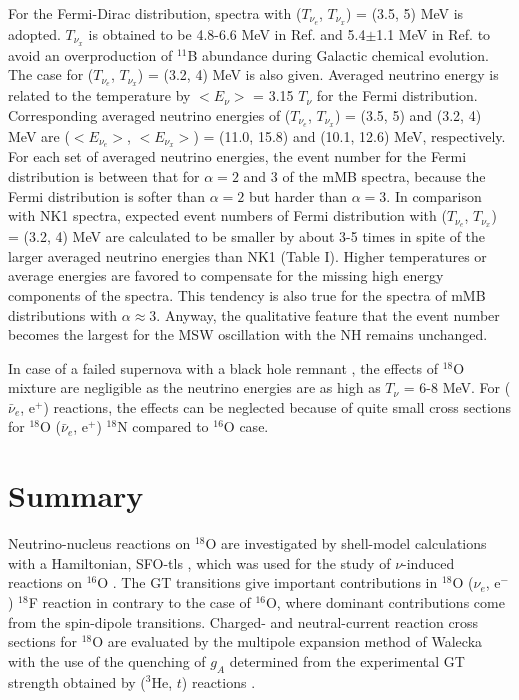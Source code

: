 \documentclass[preprint,12pt]{elsarticle}
\begin{document}
For the Fermi-Dirac distribution, spectra with ($T_{\nu_e}$, $T_{\nu_x}$) = (3.5, 5) MeV is adopted. %
$T_{\nu_x}$ is obtained to be 4.8-6.6 MeV in Ref. \cite{Yoshida2005} and 5.4$\pm$1.1 MeV in Ref. \cite{Yoshida2008} to avoid an overproduction of $^{11}$B abundance during Galactic chemical evolution.  
The case for ($T_{\nu_e}$, $T_{\nu_x}$) = (3.2, 4) MeV 
is also given.
Averaged neutrino energy is related to the temperature by $<E_{\nu}>$ = 3.15 $T_{\nu}$ for the Fermi distribution.
Corresponding averaged neutrino energies of ($T_{\nu_e}$, $T_{\nu_x}$) = (3.5, 5) and (3.2, 4) MeV are ($<E_{\nu_e}>$, $<E_{\nu_x}>$) = (11.0, 15.8) and (10.1, 12.6) MeV, respectively.
For each set of averaged neutrino energies, the event number for the Fermi distribution is between that for $\alpha=2$ and 3 of the mMB spectra, because the Fermi distribution is softer than $\alpha=2$ but harder than $\alpha=3$.
In comparison with NK1 spectra, expected event numbers of Fermi distribution with ($T_{\nu_e}$, $T_{\nu_x}$) = (3.2, 4) MeV are calculated to be smaller by about 3-5 times in spite of the larger averaged neutrino energies than NK1 (Table I).
Higher temperatures or average energies are favored to compensate for 
the missing high energy components of the spectra.
This tendency is also true for the spectra of mMB distributions 
with $\alpha\approx 3$.
Anyway, the qualitative feature that the event number becomes the largest for the MSW oscillation with the NH remains unchanged.    

In case of a failed supernova with a black hole remnant \cite{Nakazato2018}, the effects of $^{18}$O mixture are negligible as the neutrino energies are as high as $T_{\nu}$ = 6-8 MeV.    
For ($\bar{\nu}_e$, e$^{+}$) reactions, the effects can be neglected because of quite small cross sections for $^{18}$O ($\bar{\nu}_e$, e$^{+}$) $^{18}$N compared to $^{16}$O case.  


\section{Summary}
Neutrino-nucleus reactions on $^{18}$O are investigated by shell-model calculations with a Hamiltonian, SFO-tls \cite{SFO}, which was used for the study of $\nu$-induced reactions on $^{16}$O \cite{SC2018}.
The GT transitions give important contributions in $^{18}$O ($\nu_e$, e$^{-}$) $^{18}$F reaction in contrary to the case of $^{16}$O, where dominant contributions come from the spin-dipole transitions.
Charged- and neutral-current reaction cross sections for $^{18}$O are evaluated by the multipole expansion method of Walecka \cite{Wal} with the use of the quenching of $g_A$ determined from the experimental GT strength obtained by ($^{3}$He, $t$) reactions \cite{ox18gt}. 
\end{document}
